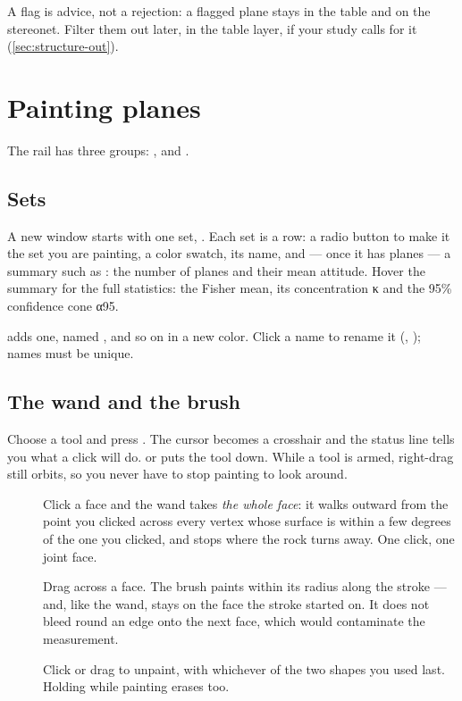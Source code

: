 A flag is advice, not a rejection: a flagged plane stays in the table and on the stereonet. Filter them out later, in the table layer, if your study calls for it (\cref{sec:structure-out}).

\section{Painting planes}\label{sec:structure-paint}

The rail has three groups: ,  and .

\subsection{Sets}

A new window starts with one set, . Each set is a row: a radio button to make it the set you are painting, a color swatch, its name, and — once it has planes — a summary such as : the number of planes and their mean attitude. Hover the summary for the full statistics: the Fisher mean, its concentration κ and the 95\% confidence cone α95.

 adds one, named ,  and so on in a new color. Click a name to rename it (, ); names must be unique.

\subsection{The wand and the brush}

Choose a tool and press . The cursor becomes a crosshair and the status line tells you what a click will do.  or  puts the tool down. While a tool is armed, right-drag still orbits, so you never have to stop painting to look around.

\begin{description}
\item[] Click a face and the wand takes \emph{the whole face}: it walks outward from the point you clicked across every vertex whose surface is within a few degrees of the one you clicked, and stops where the rock turns away. One click, one joint face.
\item[] Drag across a face. The brush paints within its radius along the stroke — and, like the wand, stays on the face the stroke started on. It does not bleed round an edge onto the next face, which would contaminate the measurement.
\item[] Click or drag to unpaint, with whichever of the two shapes you used last. Holding  while painting erases too.
\end{description}

